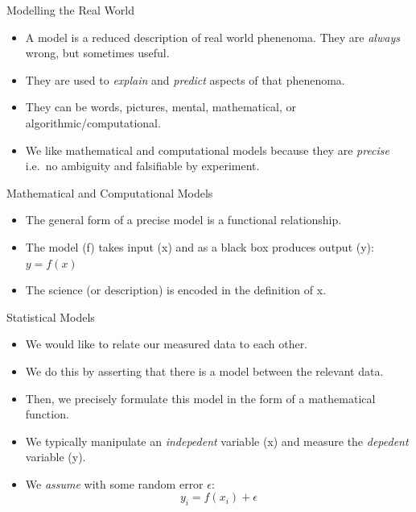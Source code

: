 \documentclass[
  ignorenonframetext,
]{beamer}
\begin{document}
\begin{frame}{Modelling the Real World}
\protect\hypertarget{modelling-the-real-world}{}
\begin{itemize}
\item
  A model is a reduced description of real world phenenoma. They are
  \emph{always} wrong, but sometimes useful.
\item
  They are used to \emph{explain} and \emph{predict} aspects of that
  phenenoma.
\item
  They can be words, pictures, mental, mathematical, or
  algorithmic/computational.
\item
  We like mathematical and computational models because they are
  \emph{precise} i.e.~no ambiguity and falsifiable by experiment.
\end{itemize}
\end{frame}

\begin{frame}{Mathematical and Computational Models}
\protect\hypertarget{mathematical-and-computational-models}{}
\begin{itemize}
\item
  The general form of a precise model is a functional relationship.
\item
  The model (f) takes input (x) and as a black box produces output (y):
  \(y = f(x)\)
\item
  The science (or description) is encoded in the definition of x.
\end{itemize}
\end{frame}

\begin{frame}{Statistical Models}
\protect\hypertarget{statistical-models}{}
\begin{itemize}
\item
  We would like to relate our measured data to each other.
\item
  We do this by asserting that there is a model between the relevant
  data.
\item
  Then, we precisely formulate this model in the form of a mathematical
  function.
\item
  We typically manipulate an \emph{indepedent} variable (x) and measure
  the \emph{depedent} variable (y).
\item
  We \emph{assume} with some random error \(\epsilon\):
  \[y_i = f(x_i) + \epsilon\]
\end{itemize}
\end{frame}
\end{document}
